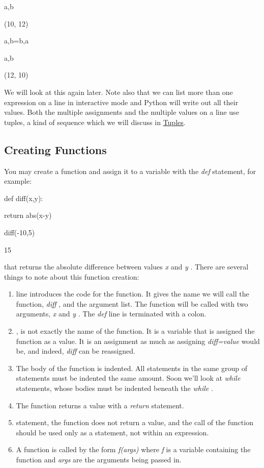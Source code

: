 a,b

(10, 12)


a,b=b,a


a,b

(12, 10)

We will look at this again later.
Note also that we can list more than one expression on a line in
interactive mode and Python will write out all their values. Both the
multiple assignments and the multiple values on a line use tuples, a
kind of sequence which we will discuss in
\href{chap2.html\#92836}{Tuples}.

\subsection{Creating Functions}
\label{creating-functions}

You may create a function and
assign it to a variable with the \emph{def} statement, for example:


def diff(x,y):

 return abs(x-y)




diff(-10,5)

15

 that
returns the absolute difference between values \emph{x} and \emph{y} .
There are several things to note about this function creation:

\begin{enumerate}
\tightlist
\item
   line introduces
  the code for the function. It gives the name we will call the
  function, \emph{diff} , and the argument list. The function will be
  called with two arguments, \emph{x} and \emph{y} . The \emph{def} line
  is terminated with a colon.
\item
   , is not
  exactly the name of the function. It is a variable that is assigned
  the function as a value. It is an assignment as much as assigning
  \emph{diff=value} would be, and indeed, \emph{diff} can be reassigned.
\item
  The body of the function is
  indented. All statements in the same group of statements must be
  indented the same amount. Soon we'll look at \emph{while} statements,
  whose bodies must be indented beneath the \emph{while} .
\item
  The function returns a value with
  a \emph{return} statement.
\item
  
  statement, the function does not return a value, and the call of the
  function should be used only as a statement, not within an expression.
\item
  A function is called by the form
  \emph{f(args)} where \emph{f} is a variable containing the function
  and \emph{args} are the arguments being passed in.
\end{enumerate}

